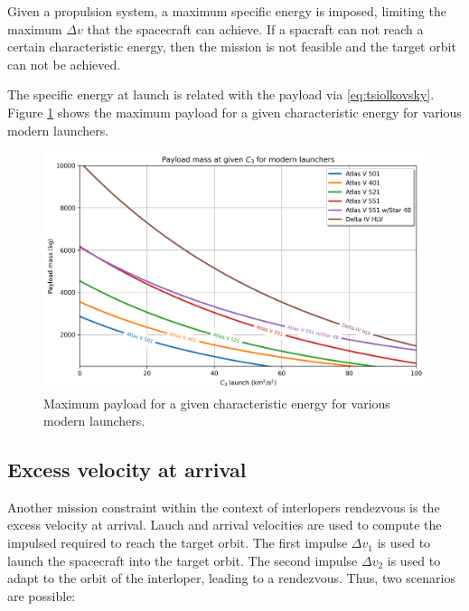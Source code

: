 Given a propulsion system, a maximum specific energy is imposed, limiting the
maximum $\Delta v$ that the spacecraft can achieve. If a spacraft can not reach
a certain characteristic energy, then the mission is not feasible and the
target orbit can not be achieved.

The specific energy at launch is related with the payload via
\ref{eq:tsiolkovsky}. Figure \ref{fig:payload_vs_c3} shows the maximum payload for a
given characteristic energy for various modern launchers.

\begin{figure}[H]
  \centering
  \includegraphics[width=\textwidth]{fig/static/payload_vs_c3}
   \caption[Maximum payload for a given characteristic energy for various modern]{Maximum payload for a given characteristic energy for various modern launchers.}
  \label{fig:payload_vs_c3}
\end{figure}

\subsection{Excess velocity at arrival}
\label{sec:excess_velocity}

Another mission constraint within the context of interlopers rendezvous is the
excess velocity at arrival. Lauch and arrival velocities are used to compute the
impulsed required to reach the target orbit. The first impulse $\Delta v_1$ is
used to launch the spacecraft into the target orbit. The second impulse $\Delta
  v_2$ is used to adapt to the orbit of the interloper, leading to a rendezvous.
Thus, two scenarios are possible:

